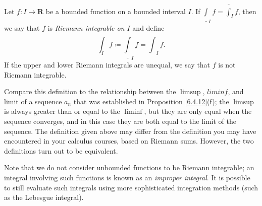 \begin{definition}\label{11.3.4}
    Let \(f : I \to \mathbf{R}\) be a bounded function on a bounded interval \(I\).
    If \(\underline{\int}_I f = \overline{\int}_I f\), then we say that \(f\) is \emph{Riemann integrable on \(I\)} and define
    \[
        \int_I f \coloneqq \underline{\int}_I f = \overline{\int}_I f.
    \]
    If the upper and lower Riemann integrals are unequal, we say that \(f\) is not Riemann integrable.
\end{definition}

\begin{remark}\label{11.3.5}
    Compare this definition to the relationship between the \(\limsup\), \(liminf\), and limit of a sequence \(a_n\) that was established in Proposition \ref{6.4.12}(f);
    the \(\limsup\) is always greater than or equal to the \(\liminf\), but they are only equal when the sequence converges, and in this case they are both equal to the limit of the sequence.
    The definition given above may differ from the definition you may have encountered in your calculus courses, based on Riemann sums.
    However, the two definitions turn out to be equivalent.
\end{remark}

\begin{remark}\label{11.3.6}
    Note that we do not consider unbounded functions to be Riemann integrable;
    an integral involving such functions is known as an \emph{improper integral}.
    It is possible to still evaluate such integrals using more sophisticated integration methods (such as the Lebesgue integral).
\end{remark}